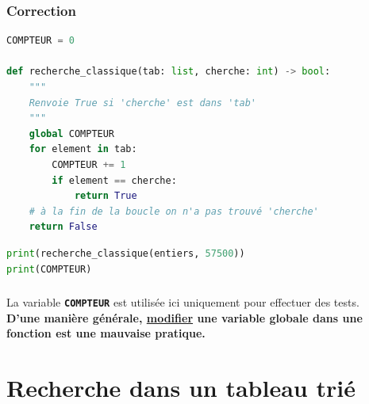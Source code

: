 \documentclass[svgnames,11pt]{beamer}
\begin{document}
\begin{frame}[fragile]
    \frametitle{Correction}

\begin{center}
\begin{lstlisting}[language=Python , basicstyle=\ttfamily\small, xleftmargin=0.2em, xrightmargin=-2.5em]
COMPTEUR = 0

def recherche_classique(tab: list, cherche: int) -> bool:
    """
    Renvoie True si 'cherche' est dans 'tab'
    """
    global COMPTEUR
    for element in tab:
        COMPTEUR += 1
        if element == cherche:
            return True
    # à la fin de la boucle on n'a pas trouvé 'cherche'
    return False
\end{lstlisting}
\end{center}
\begin{center}
    \begin{lstlisting}[language=Python , basicstyle=\ttfamily\small, xleftmargin=2em, xrightmargin=2em]
print(recherche_classique(entiers, 57500))
print(COMPTEUR)
\end{lstlisting}
    \label{CODE}
    \end{center}
\end{frame}
\begin{frame}
    \frametitle{}

    \begin{aretenir}[]
    La variable \textbf{\texttt{COMPTEUR}} est utilisée ici uniquement pour effectuer des tests. \\\textbf{D'une manière générale, \underline{modifier} une variable globale dans une fonction est une mauvaise pratique.}
    \end{aretenir}

\end{frame}
\section{Recherche dans un tableau trié}
\end{document}
